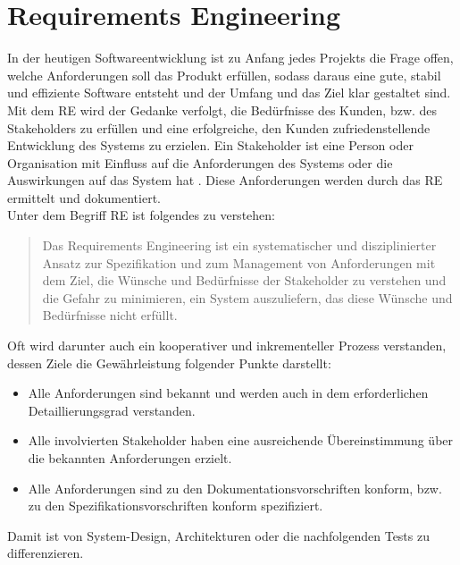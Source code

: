 \section{Requirements Engineering}
\label{sec:requirementsengineering}
    In der heutigen Softwareentwicklung ist zu Anfang jedes Projekts die Frage offen, welche Anforderungen soll das 
    Produkt erfüllen, sodass daraus eine gute, stabil und effiziente Software entsteht und der Umfang und das Ziel 
    klar gestaltet sind. Mit dem \acl{RE} wird der Gedanke verfolgt, die Bedürfnisse des Kunden, bzw. des Stakeholders 
    zu erfüllen und eine erfolgreiche, den Kunden zufriedenstellende Entwicklung des Systems zu erzielen. Ein Stakeholder 
    ist eine Person oder Organisation mit Einfluss auf die Anforderungen des Systems oder die Auswirkungen auf das System 
    hat \cite{pohl2021basiswissen}.
    Diese Anforderungen werden durch das \acl{RE} ermittelt und dokumentiert. 
    \\
    \linebreak
    Unter dem Begriff \ac{RE} ist folgendes zu verstehen: 
    \begin{quote}
        Das Requirements Engineering ist ein systematischer und disziplinierter Ansatz zur Spezifikation und zum 
        Management von Anforderungen mit dem Ziel, die Wünsche und Bedürfnisse der Stakeholder zu verstehen und 
        die Gefahr zu minimieren, ein System auszuliefern, das diese Wünsche und Bedürfnisse nicht erfüllt. \cite{pohl2021basiswissen}
    \end{quote}
    Oft wird darunter auch ein kooperativer und inkrementeller Prozess verstanden, dessen Ziele die Gewährleistung 
    folgender Punkte darstellt:
    \begin{itemize}
        \item Alle Anforderungen sind bekannt und werden auch in dem erforderlichen Detaillierungsgrad verstanden.
        \item Alle involvierten Stakeholder haben eine ausreichende Übereinstimmung über die bekannten Anforderungen erzielt.
        \item Alle Anforderungen sind zu den Dokumentationsvorschriften konform, bzw. zu den Spezifikationsvorschriften konform spezifiziert.
    \end{itemize}
    Damit ist von System-Design, Architekturen oder die nachfolgenden Tests zu differenzieren. 
